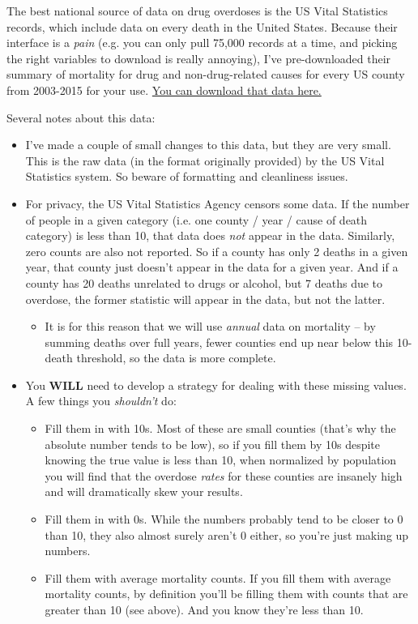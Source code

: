 \documentclass[12pt]{article}
\begin{document}
The best national source of data on drug overdoses is the US Vital Statistics records, which include data on every death in the United States. Because their interface is a \emph{pain} (e.g. you can only pull 75,000 records at a time, and picking the right variables to download is really annoying), I've pre-downloaded their summary of mortality for drug and non-drug-related causes for every US county from 2003-2015 for your use. \href{https://www.dropbox.com/s/kad4dwebr88l3ud/US_VitalStatistics.zip?dl=0}{You can download that data here.}

Several notes about this data:
\begin{itemize}
  \item I've made a couple of small changes to this data, but they are very small. This is the raw data (in the format originally provided) by the US Vital Statistics system. So beware of formatting and cleanliness issues.
  \item For privacy, the US Vital Statistics Agency censors some data. If the number of people in a given category (i.e. one county / year / cause of death category) is less than 10, that data does \emph{not} appear in the data. Similarly, zero counts are also not reported. So if a county has only 2 deaths in a given year, that county just doesn't appear in the data for a given year. And if a county has 20 deaths unrelated to drugs or alcohol, but 7 deaths due to overdose, the former statistic will appear in the data, but not the latter.
  \begin{itemize}
    \item It is for this reason that we will use \emph{annual} data on mortality -- by summing deaths over full years, fewer counties end up near below this 10-death threshold, so the data is more complete.
  \end{itemize}
  \item You \textbf{WILL} need to develop a strategy for dealing with these missing values. A few things you \emph{shouldn't} do:
  \begin{itemize}
    \item Fill them in with 10s. Most of these are small counties (that's why the absolute number tends to be low), so if you fill them by 10s despite knowing the true value is less than 10, when normalized by population you will find that the overdose \emph{rates} for these counties are insanely high and will dramatically skew your results.
    \item Fill them in with 0s. While the numbers probably tend to be closer to 0 than 10, they also almost surely aren't 0 either, so you're just making up numbers.
    \item Fill them with average mortality counts. If you fill them with average mortality counts, by definition you'll be filling them with counts that are greater than 10 (see above). And you know they're less than 10.
  \end{itemize}
\end{itemize}
\end{document}
